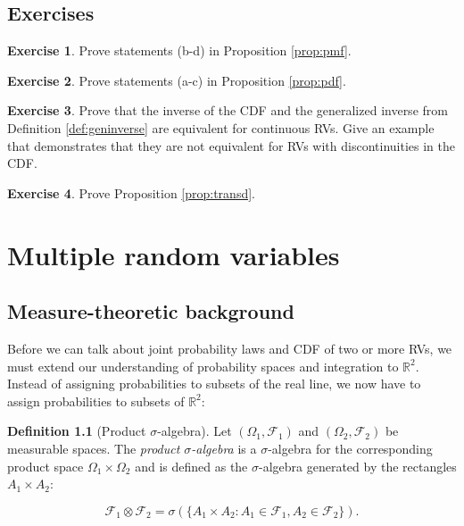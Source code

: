 \documentclass{book}
\theoremstyle{plain}%
\theoremstyle{definition}
\newtheorem{definition}{Definition}[section]
\newtheorem{exercise}{Exercise}[chapter]
\begin{document}
\section*{Exercises}

\begin{exercise}
Prove statements (b-d) in Proposition \ref{prop:pmf}.
\end{exercise}

\begin{exercise}
Prove statements (a-c) in Proposition \ref{prop:pdf}.
\end{exercise}

\begin{exercise}
Prove that the inverse of the CDF and the generalized inverse from Definition \ref{def:geninverse} are equivalent for continuous RVs. Give an example that demonstrates that they are not equivalent for RVs with discontinuities in the CDF.
\end{exercise}

\begin{exercise}
Prove Proposition \ref{prop:transd}.
\end{exercise}



\chapter{Multiple random variables}



\section{Measure-theoretic background}

Before we can talk about joint probability laws and CDF of two or more RVs, we must extend our understanding of probability spaces and integration to $\mathbb{R}^2$. Instead of assigning probabilities to subsets of the real line, we now have to assign probabilities to subsets of $\mathbb{R}^2$:

\begin{definition}[Product $\sigma$-algebra]
Let $(\Omega_1, \mathcal{F}_1)$ and $(\Omega_2, \mathcal{F}_2)$ be measurable spaces. The \emph{product $\sigma$-algebra} is a $\sigma$-algebra for the corresponding product space $\Omega_1 \times \Omega_2$ and is defined as the $\sigma$-algebra generated by the rectangles $A_1 \times A_2$:

$$\mathcal{F}_1 \otimes \mathcal{F}_2  = \sigma(\{A_1 \times A_2: A_1 \in \mathcal{F}_1, A_2 \in \mathcal{F}_2 \}).$$
\end{definition}
\end{document}
